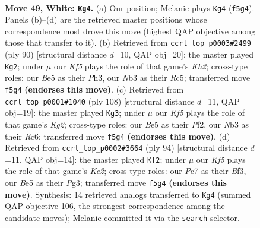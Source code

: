\documentclass[11pt]{article}
\begin{document}
\clearpage

\begin{figure}[p]\centering
\begin{subfigure}{0.46\textwidth}\centering
\resizebox{\linewidth}{!}{%
\newchessgame
\chessboard[
  setfen={6k1/2P5/2r5/4BK2/8/1N6/8/8 w - - 11 49},
  showmover=false,
  pgfstyle=straightmove, color=movearrow, markmove={f5-g4}
]}
\caption{}
\end{subfigure}\hfill
\begin{subfigure}{0.46\textwidth}\centering
\resizebox{\linewidth}{!}{%
\newchessgame
\chessboard[
  setfen={8/8/6k1/2R5/8/7P/5P1K/5r2 w - - 14 46},
  showmover=false,
  pgfstyle=straightmove, color=movearrow, markmove={h2-g2}
]}
\caption{}
\end{subfigure}
\\[4pt]
\begin{subfigure}{0.46\textwidth}\centering
\resizebox{\linewidth}{!}{%
\newchessgame
\chessboard[
  setfen={8/6k1/2R5/7r/7P/8/5PK1/8 w - - 1 55},
  showmover=false,
  pgfstyle=straightmove, color=movearrow, markmove={g2-g3}
]}
\caption{}
\end{subfigure}\hfill
\begin{subfigure}{0.46\textwidth}\centering
\resizebox{\linewidth}{!}{%
\newchessgame
\chessboard[
  setfen={8/7p/8/8/3k4/1r3BP1/4K3/8 w - - 3 48},
  showmover=false,
  pgfstyle=straightmove, color=movearrow, markmove={e2-f2}
]}
\caption{}
\end{subfigure}
\caption{\textbf{Move 49, White: \texttt{Kg4}.} (a) Our position; Melanie plays \texttt{Kg4} (\texttt{f5g4}). Panels (b)--(d) are the retrieved master positions whose correspondence most drove this move (highest QAP objective among those that transfer to it). (b) Retrieved from \texttt{ccrl\_top\_p0003\#2499} (ply 90) [structural distance $d$=10, QAP obj=20]: the master played \texttt{Kg2}; under $\mu$ our \emph{Kf5} plays the role of that game's \emph{Kh2}; cross-type roles: our \emph{B}e5 as their \emph{P}h3, our \emph{N}b3 as their \emph{R}c5; transferred move \texttt{f5g4} \textbf{(endorses this move)}. (c) Retrieved from \texttt{ccrl\_top\_p0001\#1040} (ply 108) [structural distance $d$=11, QAP obj=19]: the master played \texttt{Kg3}; under $\mu$ our \emph{Kf5} plays the role of that game's \emph{Kg2}; cross-type roles: our \emph{B}e5 as their \emph{P}f2, our \emph{N}b3 as their \emph{R}c6; transferred move \texttt{f5g4} \textbf{(endorses this move)}. (d) Retrieved from \texttt{ccrl\_top\_p0002\#3664} (ply 94) [structural distance $d$=11, QAP obj=14]: the master played \texttt{Kf2}; under $\mu$ our \emph{Kf5} plays the role of that game's \emph{Ke2}; cross-type roles: our \emph{P}c7 as their \emph{B}f3, our \emph{B}e5 as their \emph{P}g3; transferred move \texttt{f5g4} \textbf{(endorses this move)}. Synthesis: 14 retrieved analogs transferred to \texttt{Kg4} (summed QAP objective 106, the strongest correspondence among the candidate moves); Melanie committed it via the \texttt{search} selector.}
\label{fig:thought-m96}
\end{figure}
\end{document}
